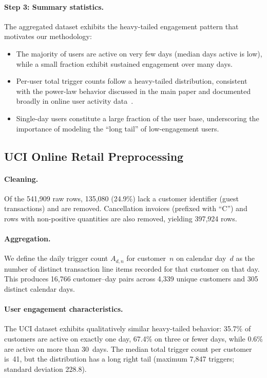 \paragraph{Step 3: Summary statistics.}
The aggregated dataset exhibits the heavy-tailed engagement
pattern that motivates our methodology:
\begin{itemize}[leftmargin=*]
  \item The majority of users are active on very few days
        (median days active is low), while a small fraction
        exhibit sustained engagement over many days.
  \item Per-user total trigger counts follow a heavy-tailed
        distribution, consistent with the power-law behavior
        discussed in the main paper and documented broadly
        in online user activity data~\citep{clauset2009power}.
  \item Single-day users constitute a large fraction of the
        user base, underscoring the importance of modeling
        the ``long tail'' of low-engagement users.
\end{itemize}

\subsection{UCI Online Retail Preprocessing}
\label{subsec:uci_preprocessing}

\paragraph{Cleaning.}
Of the 541,909 raw rows, 135,080 (24.9\%) lack a customer
identifier (guest transactions) and are removed.
Cancellation invoices (prefixed with ``C'') and rows with
non-positive quantities are also removed, yielding 397,924 rows.

\paragraph{Aggregation.}
We define the daily trigger count $A_{d,n}$ for customer~$n$
on calendar day~$d$ as the number of distinct transaction line
items recorded for that customer on that day.
This produces 16,766 customer--day pairs across 4,339 unique
customers and 305 distinct calendar days.

\paragraph{User engagement characteristics.}
The UCI dataset exhibits qualitatively similar heavy-tailed
behavior:
35.7\% of customers are active on exactly one day,
67.4\% on three or fewer days,
while 0.6\% are active on more than 30~days.
The median total trigger count per customer is~41,
but the distribution has a long right tail
(maximum 7,847 triggers; standard deviation 228.8).

